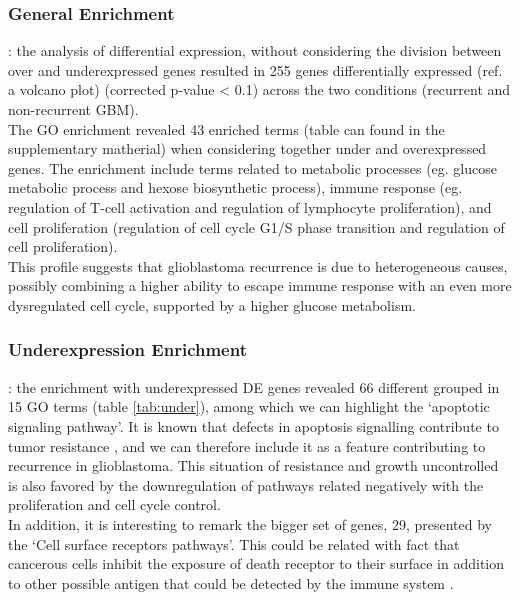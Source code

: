 \documentclass[9pt,twocolumn,twoside]{gsajnl}
\begin{document}
\subsubsection*{General Enrichment}: the analysis of differential expression, without considering the division between over and underexpressed genes resulted in 255 genes differentially expressed (ref. a volcano plot) (corrected p-value < 0.1) across the two conditions (recurrent and non-recurrent GBM).\\
The GO enrichment revealed 43 enriched terms (table can found in the supplementary matherial) when considering together under and overexpressed genes. The enrichment include terms related to metabolic processes (eg. glucose metabolic process and hexose biosynthetic process), immune response (eg. regulation of T-cell activation and regulation of lymphocyte proliferation), and cell proliferation (regulation of cell cycle G1/S phase transition and regulation of cell proliferation).\\
This profile suggests that glioblastoma recurrence is due to heterogeneous causes, possibly combining a higher ability to escape immune response with an even more dysregulated cell cycle, supported by a higher glucose metabolism.

\subsubsection*{Underexpression Enrichment}: the enrichment with underexpressed DE genes revealed 66 different grouped in 15 GO terms (table \ref{tab:under}), among which we can highlight the `apoptotic signaling pathway'. It is known that defects in apoptosis signalling contribute to tumor resistance \citep{Debatin2004}, and we can therefore include it as a feature contributing to recurrence in glioblastoma. This situation of resistance and growth uncontrolled is also favored by the downregulation of pathways related negatively with the proliferation and cell cycle control.\\
In addition, it is interesting to remark the bigger set of genes, 29, presented by the `Cell surface receptors pathways'. This could be related with fact that cancerous cells inhibit the exposure of death receptor to their surface in addition to other possible antigen that could be detected by the immune system \citep{Ozoren2003}.
\end{document}
